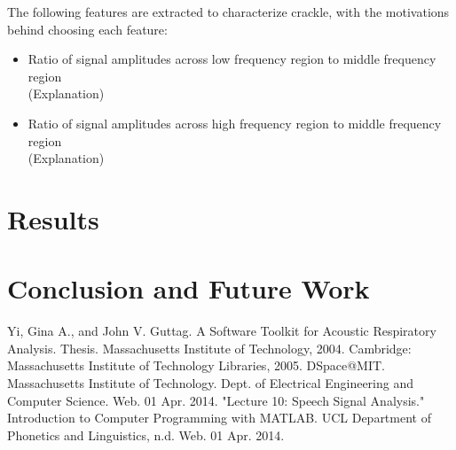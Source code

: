 \documentclass{article}
\begin{document}
The following features are extracted to characterize crackle, with the motivations behind choosing each feature: \\

\begin{itemize}
\item
	Ratio of signal amplitudes across low frequency region to middle frequency region\\
	(Explanation)\\
\item
	Ratio of signal amplitudes across high frequency region to middle frequency region\\
	(Explanation)\\
\end{itemize}

\section{Results}

\section{Conclusion and Future Work}

\newpage

\begin{thebibliography}{9}

	Yi, Gina A., and John V. Guttag. A Software Toolkit for Acoustic Respiratory Analysis. Thesis. Massachusetts Institute of Technology, 2004. Cambridge: Massachusetts Institute of Technology Libraries, 2005. DSpace@MIT. Massachusetts Institute of Technology. Dept. of Electrical Engineering and Computer Science. Web. 01 Apr. 2014.
	"Lecture 10: Speech Signal Analysis." Introduction to Computer Programming with MATLAB. UCL Department of Phonetics and Linguistics, n.d. Web. 01 Apr. 2014.

\end{thebibliography}
\end{document}
